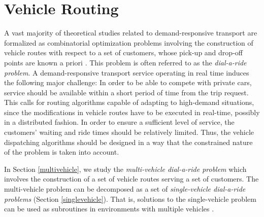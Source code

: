 \documentclass[dissertation,draft*]{aaltoseries}
\begin{document}



\chapter{Vehicle Routing}
\label{vehiclerouting}
A vast majority of theoretical studies related to demand-responsive transport are formalized as combinatorial
optimization problems involving the construction of vehicle routes with respect to
a set of customers, whose pick-up and drop-off points are known a priori \cite{toth03}.
This problem is often referred to as the \emph{dial-a-ride problem}.
A demand-responsive transport service operating in real time induces the following major challenge: 
In order to be able to compete with private cars, service
should be available within a short period of time from the trip request.
This calls for routing algorithms capable of adapting to high-demand situations, since the modifications 
in vehicle routes have to be executed in real-time, possibly in a distributed fashion.
In order to ensure a sufficient level of service, the customers' waiting and ride times 
should be relatively limited. Thus, the vehicle dispatching algorithms should be designed
in a way that the constrained nature of the problem is taken into account.



In Section \ref{multivehicle}, we study the \emph{multi-vehicle dial-a-ride problem} which involves the construction
of a set of vehicle routes serving a set of customers. The multi-vehicle problem can be decomposed as a set 
of \emph{single-vehicle dial-a-ride problems} (Section \ref{singlevehicle}). That is, solutions to the single-vehicle problem can be 
used as subroutines in environments with multiple vehicles \cite{psaraftis01,psaraftis02}. 




\end{document}
